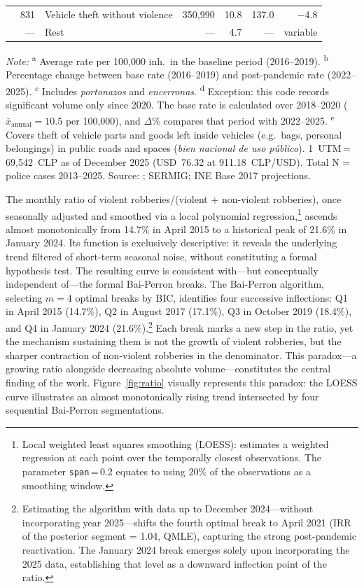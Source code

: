 \documentclass[pdflatex,sn-basic]{sn-jnl}
\newcommand{\tablenote}[1]{%
  \vspace{2pt}%
  {\par\footnotesize\textit{Note:} #1\par}%
}
\begin{document}
\begin{table}[htbp]
{\begin{tabular}{lrp{4.5cm}rrrr}
 & 831 & Vehicle theft without violence  & 350,990 & 10.8 & 137.0 & $-$4.8  \\
 & --- & Rest                          &    --- &  4.7 &   --- & variable \\
\bottomrule
\end{tabular}
}
\tablenote{\textsuperscript{a} Average rate per 100,000 inh.\ in the baseline period (2016--2019). \textsuperscript{b} Percentage change between base rate (2016--2019) and post-pandemic rate (2022--2025). \textsuperscript{c} Includes \textit{portonazos} and \textit{encerronas}. \textsuperscript{d} Exception: this code records significant volume only since 2020. The base rate is calculated over 2018--2020 ($\bar{x}_{\text{annual}} = 10.5$ per 100,000), and $\Delta$\% compares that period with 2022--2025. \textsuperscript{e} Covers theft of vehicle parts and goods left inside vehicles (e.g.\ bags, personal belongings) in public roads and spaces (\textit{bien nacional de uso p\'ublico}). 1~UTM\,=\,69,542~CLP as of December 2025 (USD~76.32 at 911.18~CLP/USD). Total N = police cases 2013--2025. Source: \citet{INE2026}; SERMIG; INE Base 2017 projections.}
\end{table}

The monthly ratio of violent robberies/(violent + non-violent robberies), once seasonally adjusted and smoothed via a local polynomial regression,\footnote{Local weighted least squares smoothing (LOESS): estimates a weighted regression at each point over the temporally closest observations. The parameter \texttt{span}\,=\,0.2 equates to using 20\% of the observations as a smoothing window.} ascends almost monotonically from 14.7\% in April 2015 to a historical peak of 21.6\% in January 2024. Its function is exclusively descriptive: it reveals the underlying trend filtered of short-term seasonal noise, without constituting a formal hypothesis test. The resulting curve is consistent with---but conceptually independent of---the formal Bai-Perron breaks. The Bai-Perron algorithm, selecting $m=4$ optimal breaks by BIC, identifies four successive inflections: Q1 in April 2015 (14.7\%), Q2 in August 2017 (17.1\%), Q3 in October 2019 (18.4\%), and Q4 in January 2024 (21.6\%).\footnote{Estimating the algorithm with data up to December 2024---without incorporating year 2025---shifts the fourth optimal break to April 2021 (IRR of the posterior segment = 1.04, QMLE), capturing the strong post-pandemic reactivation. The January 2024 break emerges solely upon incorporating the 2025 data, establishing that level as a downward inflection point of the ratio.} Each break marks a new step in the ratio, yet the mechanism sustaining them is not the growth of violent robberies, but the sharper contraction of non-violent robberies in the denominator. This paradox---a growing ratio alongside decreasing absolute volume---constitutes the central finding of the work. Figure~\ref{fig:ratio} visually represents this paradox: the LOESS curve illustrates an almost monotonically rising trend intersected by four sequential Bai-Perron segmentations.
\end{document}
